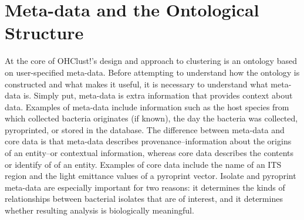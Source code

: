 \documentclass[12pt]{ucthesis}
\begin{document}
   \section{Meta-data and the Ontological Structure}\label{sec:ontology_structure}
      At the core of \textsf{OHClust!}'s design and approach to clustering is an
      ontology based on user-specified meta-data. Before attempting to understand
      how the ontology is constructed and what makes it useful, it is necessary
      to understand what meta-data is. Simply put, meta-data is extra information
      that provides context about data. Examples of meta-data include information
      such as the host species from which collected bacteria originates (if
      known), the day the bacteria was collected, pyroprinted, or stored in the
      database. The difference between meta-data and core data is that meta-data
      describes provenance--information about the origins of an entity--or
      contextual information, whereas core data describes the contents or identify
      of of an entity. Examples of core data include the name of an ITS region and
      the light emittance values of a pyroprint vector. Isolate and pyroprint
      meta-data are especially important for two reasons: it determines the kinds
      of relationships between bacterial isolates that are of interest, and it
      determines whether resulting analysis is biologically meaningful.
      
\end{document}
